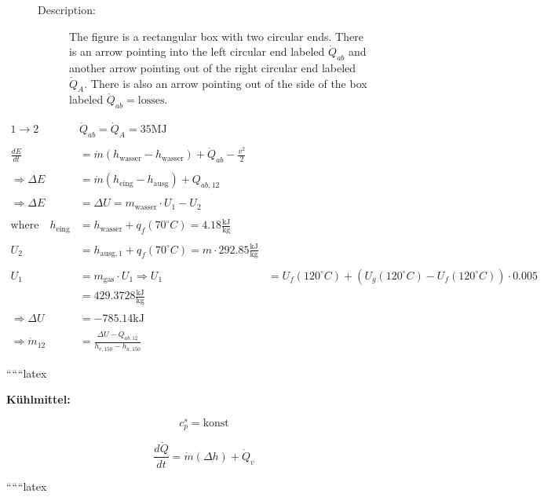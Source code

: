 \begin{figure}[h!]
\centering
\begin{minipage}{0.5\textwidth}
\centering
\begin{description}
\item[Description:] The figure is a rectangular box with two circular ends. There is an arrow pointing into the left circular end labeled $\dot{Q}_{ab}$ and another arrow pointing out of the right circular end labeled $\dot{Q}_A$. There is also an arrow pointing out of the side of the box labeled $\dot{Q}_{ab} = \text{losses}$.
\end{description}
\end{minipage}
\end{figure}

\begin{align*}
1 \rightarrow 2 \quad & \dot{Q}_{ab} = \dot{Q}_A = 35 \text{MJ} \\
\\
\frac{dE}{dt} &= \dot{m} \left( h_{\text{wasser}} - h_{\text{wasser}} \right) + \dot{Q}_{ab} - \frac{v^2}{2} \\
\\
\Rightarrow \Delta E &= \dot{m} \left( h_{\text{eing}} - h_{\text{ausg}} \right) + Q_{ab,12} \\
\\
\Rightarrow \Delta E &= \Delta U = m_{\text{wasser}} \cdot U_1 - U_2 \\
\\
\text{where} \quad h_{\text{eing}} &= h_{\text{wasser}} + q_f (70^\circ C) = 4.18 \frac{\text{kJ}}{\text{kg}} \\
\\
U_2 &= h_{\text{ausg},1} + q_f (70^\circ C) = m \cdot 292.85 \frac{\text{kJ}}{\text{kg}} \\
\\
U_1 &= m_{\text{gas}} \cdot U_1 \Rightarrow U_1 &= U_f (120^\circ C) + \left( U_g (120^\circ C) - U_f (120^\circ C) \right) \cdot 0.005 \\
&= 429.3728 \frac{\text{kJ}}{\text{kg}} \\
\\
\Rightarrow \Delta U &= -785.14 \text{kJ} \\
\\
\Rightarrow \dot{m}_{12} &= \frac{\Delta U - Q_{ab,12}}{h_{e,150} - h_{a,150}}
\end{align*}

``````latex


\textbf{Kühlmittel:}

\[
c_p^s = \text{konst}
\]

\[
\frac{d\dot{Q}}{dt} = \dot{m} \left( \Delta h \right) + \dot{Q}_v
\]

``````latex


